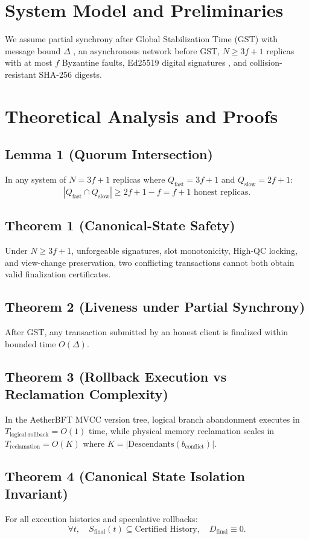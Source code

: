 \documentclass[journal,compsoc]{IEEEtran}
\begin{document}
\section{System Model and Preliminaries}
We assume partial synchrony after Global Stabilization Time (GST) with message bound $\Delta$ \cite{dwork1988consensus}, an asynchronous network before GST, $N \ge 3f + 1$ replicas with at most $f$ Byzantine faults, Ed25519 digital signatures \cite{bernstein2012high}, and collision-resistant SHA-256 digests.

\section{Theoretical Analysis and Proofs}
\subsection{Lemma 1 (Quorum Intersection)}
In any system of $N = 3f + 1$ replicas where $Q_{\text{fast}} = 3f + 1$ and $Q_{\text{slow}} = 2f + 1$:
$$|Q_{\text{fast}} \cap Q_{\text{slow}}| \ge 2f + 1 - f = f + 1 \text{ honest replicas.}$$

\subsection{Theorem 1 (Canonical-State Safety)}
Under $N \ge 3f + 1$, unforgeable signatures, slot monotonicity, High-QC locking, and view-change preservation, two conflicting transactions cannot both obtain valid finalization certificates.

\subsection{Theorem 2 (Liveness under Partial Synchrony)}
After GST, any transaction submitted by an honest client is finalized within bounded time $O(\Delta)$.

\subsection{Theorem 3 (Rollback Execution vs Reclamation Complexity)}
In the AetherBFT MVCC version tree, logical branch abandonment executes in $T_{\text{logical-rollback}} = O(1)$ time, while physical memory reclamation scales in $T_{\text{reclamation}} = O(K)$ where $K = |\text{Descendants}(b_{\text{conflict}})|$.

\subsection{Theorem 4 (Canonical State Isolation Invariant)}
For all execution histories and speculative rollbacks:
$$\forall t, \quad S_{\text{final}}(t) \subseteq \text{Certified History}, \quad D_{\text{final}} \equiv 0.$$
\end{document}
